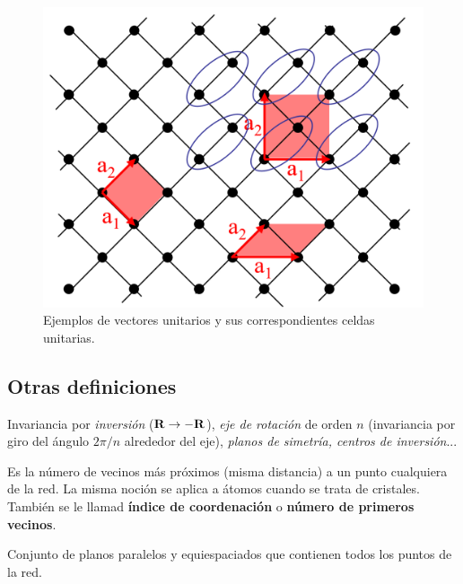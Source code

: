 \begin{figure}[h!] \centering
    \includegraphics[scale=0.6]{Cuerpo/Ch_01/celda.png}
    \caption{Ejemplos de vectores unitarios y sus correspondientes celdas unitarias.}
    \label{Fig:01-01}
\end{figure}

\subsection{Otras definiciones}
  
\begin{definition}
    Invariancia por {\it inversión} ($\mathbf{R} \rightarrow - \mathbf{R}$), {\it eje de rotación} de orden $n$ (invariancia por giro del ángulo $2\pi/n$ alrededor del eje), {\it planos de simetría, centros de inversión}...    
\end{definition}

\begin{definition}
    Es la número de vecinos más próximos (misma distancia) a un punto cualquiera de la red. La misma noción se aplica a átomos cuando se trata de cristales. También se le llamad \textbf{índice de coordenación} o \textbf{número de primeros vecinos}.
\end{definition}

\begin{definition}
    Conjunto de planos paralelos y equiespaciados que contienen todos los puntos de la red. 
\end{definition}


